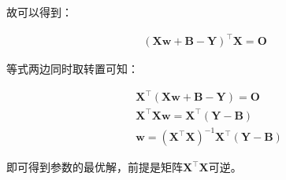 \documentclass[UTF8]{book}
\begin{document}
故可以得到：
\begin{large}
    \begin{equation}
        \begin{aligned}
            (\mathbf{X}\mathbf{w}+\mathbf{B}-\mathbf{Y})^\top\mathbf{X}=\mathbf{O}
            \nonumber
        \end{aligned}
    \end{equation}
\end{large}
等式两边同时取转置可知：
\begin{large}
    \begin{equation}
        \begin{aligned}
            &\mathbf{X}^\top(\mathbf{X}\mathbf{w}+\mathbf{B}-\mathbf{Y})=\mathbf{O} \\
            &\mathbf{X}^\top\mathbf{X}\mathbf{w}=\mathbf{X}^\top(\mathbf{Y}-\mathbf{B}) \\
            &\mathbf{w}=(\mathbf{X}^\top\mathbf{X})^{-1}\mathbf{X}^\top(\mathbf{Y}-\mathbf{B})
            \nonumber
        \end{aligned}
    \end{equation}
\end{large}
即可得到参数的最优解，前提是矩阵$\mathbf{X}^\top\mathbf{X}$可逆。
\end{document}
